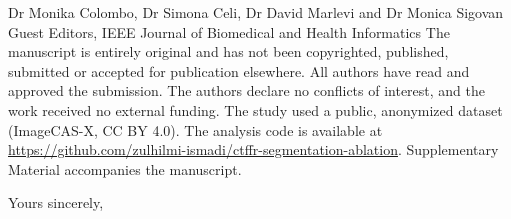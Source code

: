 \documentclass[10pt]{letter}
\begin{document}
\begin{letter}{Dr Monika Colombo, Dr Simona Celi, Dr David Marlevi and Dr Monica Sigovan\\Guest Editors, IEEE Journal of Biomedical and Health Informatics}
The manuscript is entirely original and has not been copyrighted, published, submitted or accepted for publication elsewhere. All authors have read and approved the submission. The authors declare no conflicts of interest, and the work received no external funding. The study used a public, anonymized dataset (ImageCAS-X, CC BY 4.0). The analysis code is available at \url{https://github.com/zulhilmi-ismadi/ctffr-segmentation-ablation}. Supplementary Material accompanies the manuscript.

\closing{Yours sincerely,}
\end{letter}
\end{document}
